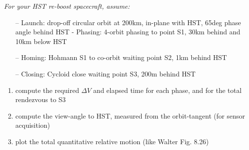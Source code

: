 \documentclass[onecolumn,10pt]{jhwhw}
\begin{document}
\problem{}
\textit{For your HST re-boost spacecraft, assume:}
\begin{itemize}
\itemsep0em
\item[--] Launch: drop-off circular orbit at 200km, in-plane with HST, 65deg phase angle behind HST - Phasing: 4-orbit phasing to point S1, 30km behind and 10km below HST
\item[--] Homing: Hohmann S1 to co-orbit waiting point S2, 1km behind HST
\item[--] Closing: Cycloid close waiting point S3, 200m behind HST
\end{itemize}
\begin{enumerate}
\itemsep0em
\item compute the required $\Delta V$ and elapsed time for each phase, and for the total rendezvous to S3
\item compute the view-angle to HST, measured from the orbit-tangent (for sensor acquisition)
\item plot the total quantitative relative motion (like Walter Fig. 8.26)
\end{enumerate}
\end{document}
